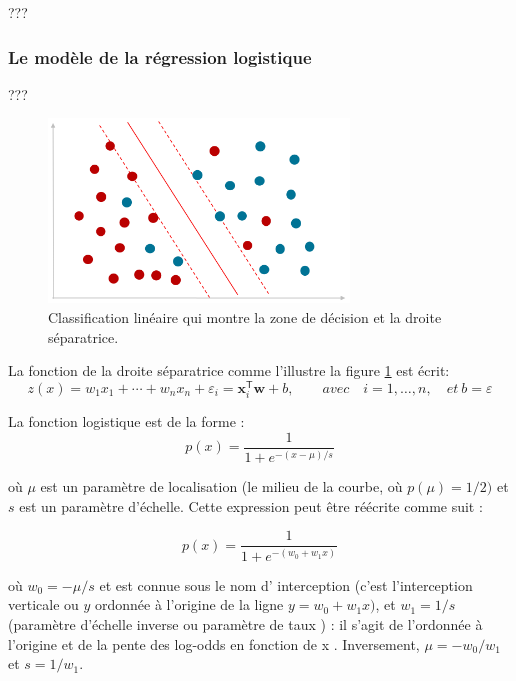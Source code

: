 		???\lipsum[1]
		
		\subsubsection{Le modèle de la régression logistique}
		
		??? \lipsum[1]
		
		
		\begin{figure}[bth]%
			\centering
			\includegraphics[width=8cm]{images/classification_minimisation.png}
			\caption{Classification linéaire qui montre la zone de décision et la droite séparatrice.}
			\label{fig:classification_zone}
		\end{figure}
	
		La fonction de la droite séparatrice comme l'illustre la figure \ref{fig:classification_zone} est écrit:
		$$
		z(x) = w _{1}x_{1}+\cdots +w_{n}x_{n}+\varepsilon _{i}=\mathbf { x} _{i}^{\mathsf {T}}{\boldsymbol {w }}+b,\qquad avec \quad i=1,\ldots ,n, \quad et \ b = \varepsilon
		$$
	
		La fonction logistique est de la forme :
		$$
		{\displaystyle p(x)={\frac {1}{1+e^{-(x-\mu )/s}}}}
		$$
		
		où $\mu$ est un paramètre de localisation (le milieu de la courbe, où ${\displaystyle p(\mu )=1/2})$ et $s$ est un paramètre d'échelle. Cette expression peut être réécrite comme suit :
		
		$${\displaystyle p(x)={\frac {1}{1+e^{-( w_{0}+w _{1}x)}}}}$$
		
		où ${\displaystyle w _{0}=-\mu /s}$ et est connue sous le nom d' interception (c'est l'interception verticale ou $y$ ordonnée à l'origine de la ligne ${\displaystyle y=w _{0}+w _{1}x})$, et ${\displaystyle w _{1}=1/s}$ (paramètre d'échelle inverse ou paramètre de taux ) : il s'agit de l'ordonnée à l'origine et de la pente des log-odds en fonction de x . Inversement, ${\displaystyle \mu =-w _{0}/w _{1}}$ et ${\displaystyle s=1/w _{1}}$.
		
